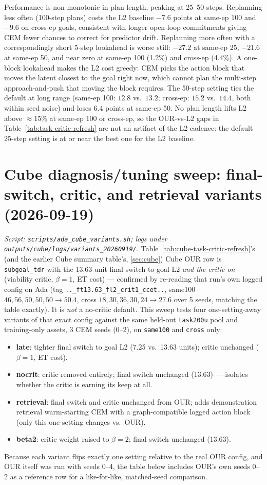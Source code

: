 \documentclass[11pt]{article}
\begin{document}
Performance is non-monotonic in plan length, peaking at 25--50 steps. Replanning less often
(100-step plans) costs the L2 baseline $-7.6$ points at same-ep 100 and $-9.6$ on cross-ep
goals, consistent with longer open-loop commitments giving CEM fewer chances to correct for
predictor drift. Replanning more often with a correspondingly short 5-step lookahead is worse
still: $-27.2$ at same-ep 25, $-21.6$ at same-ep 50, and near zero at same-ep 100 (1.2\%) and
cross-ep (4.4\%). A one-block lookahead makes the L2 cost greedy: CEM picks the action block
that moves the latent closest to the goal right now, which cannot plan the multi-step
approach-and-push that moving the block requires. The 50-step setting ties the default at
long range (same-ep 100: $12.8$ vs.\ $13.2$; cross-ep: $15.2$ vs.\ $14.4$, both within
seed noise) and loses $6.4$ points at same-ep 50. No plan length lifts L2 above
$\approx$15\% at same-ep 100 or cross-ep, so the OUR-vs-L2 gaps in
Table~\ref{tab:task-critic-refresh} are not an artifact of the L2 cadence: the default
25-step setting is at or near the best one for the L2 baseline.

\section{Cube diagnosis/tuning sweep: final-switch, critic, and retrieval variants (2026-09-19)}
\label{sec:cube-variants}
\emph{Script: \texttt{scripts/ada\_cube\_variants.sh}; logs under
\texttt{outputs/cube/logs/variants\_20260919/}.} Table~\ref{tab:cube-task-critic-refresh}'s
(and the earlier Cube summary table's, \cref{sec:cube}) Cube OUR row is \texttt{subgoal\_tdr}
with the 13.63-unit final
switch to goal L2 \emph{and the critic on} (viability critic, $\beta=1$, ET cost) --- confirmed
by re-reading that run's own logged config on Ada (tag \texttt{..\_ft13.63\_fl2\_crit1\_ccet..},
same100 $46,56,50,50,50 \to 50.4$, cross $18,30,36,30,24 \to 27.6$ over 5 seeds, matching the
table exactly). It is \emph{not} a no-critic default. This sweep tests four one-setting-away
variants of that exact config against the same held-out \texttt{task200u} pool and
training-only assets, 3 CEM seeds (0--2), on \texttt{same100} and \texttt{cross} only:
\begin{itemize}
  \item \textbf{late}: tighter final switch to goal L2 (7.25 vs.\ 13.63 units); critic unchanged
        ($\beta=1$, ET cost).
  \item \textbf{nocrit}: critic removed entirely; final switch unchanged (13.63) --- isolates
        whether the critic is earning its keep at all.
  \item \textbf{retrieval}: final switch and critic unchanged from OUR; adds demonstration
        retrieval warm-starting CEM with a graph-compatible logged action block (only this one
        setting changes vs.\ OUR).
  \item \textbf{beta2}: critic weight raised to $\beta=2$; final switch unchanged (13.63).
\end{itemize}
Because each variant flips exactly one setting relative to the real OUR config, and OUR itself
was run with seeds 0--4, the table below includes OUR's own seeds 0--2 as a reference row for a
like-for-like, matched-seed comparison.
\end{document}
